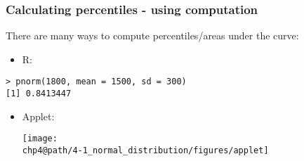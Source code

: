 \documentclass[slidestop,compress,mathserif]{beamer}
\makeatletter
\def\chp4@path{../../Chp 4}
\makeatother
\begin{document}

\begin{frame}[fragile]
\frametitle{Calculating percentiles - using computation}

There are many ways to compute percentiles/areas under the curve:

\begin{itemize}
\item R:
\end{itemize}
\begin{beamerboxesrounded}[shadow = false, lower = code body]{}
{\small \begin{verbatim}
> pnorm(1800, mean = 1500, sd = 300)
[1] 0.8413447
\end{verbatim}
}
\end{beamerboxesrounded}
\begin{itemize}
\item Applet: {\small {}}
\begin{center}
\texttt{[image: \\chp4@path/4-1\_normal\_distribution/figures/applet]}
\end{center}

\end{itemize}


\end{frame}

\end{document}
